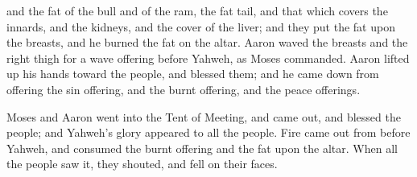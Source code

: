 {and the fat of the bull and of the ram, the fat tail, and that which covers the innards, and the kidneys, and the cover of the liver;
and they put the fat upon the breasts, and he burned the fat on the altar.
Aaron waved the breasts and the right thigh for a wave offering before Yahweh, as Moses commanded.
Aaron lifted up his hands toward the people, and blessed them; and he came down from offering the sin offering, and the burnt offering, and the peace offerings.
\par }{\PP {}Moses and Aaron went into the Tent of Meeting, and came out, and blessed the people; and Yahweh’s glory appeared to all the people.
Fire came out from before Yahweh, and consumed the burnt offering and the fat upon the altar. When all the people saw it, they shouted, and fell on their faces.

}
